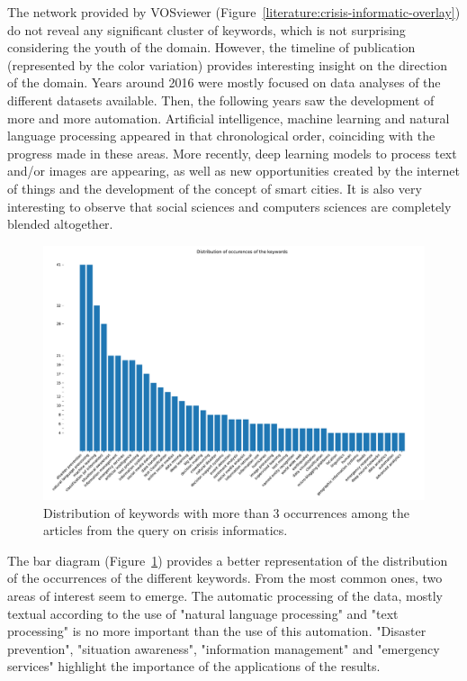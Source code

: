 The network provided by VOSviewer (Figure~\ref{literature:crisis-informatic-overlay}) do not reveal any significant cluster of keywords, which is not surprising considering the youth of the domain.
However, the timeline of publication (represented by the color variation) provides interesting insight on the direction of the domain.
Years around 2016 were mostly focused on data analyses of the different datasets available.
Then, the following years saw the development of more and more automation.
Artificial intelligence, machine learning and natural language processing appeared in that chronological order, coinciding with the progress made in these areas.
More recently, deep learning models to process text and/or images are appearing, as well as new opportunities created by the internet of things and the development of the concept of smart cities.
It is also very interesting to observe that social sciences and computers sciences are completely blended altogether.

\begin{figure}[bp]
    \centering
    \includegraphics[width=\textwidth]{figures/chap-2/crisis-informatic-bar.pdf}
    \caption{Distribution of keywords with more than 3 occurrences among the articles from the query on crisis informatics. }
    \label{literature:crisis-informatic-bar}
\end{figure}

The bar diagram (Figure~\ref{literature:crisis-informatic-bar}) provides a better representation of the distribution of the occurrences of the different keywords.
From the most common ones, two areas of interest seem to emerge.
The automatic processing of the data, mostly textual according to the use of "natural language processing" and "text processing" is no more important than the use of this automation.
"Disaster prevention", "situation awareness", "information management" and "emergency services" highlight the importance of the applications of the results.


